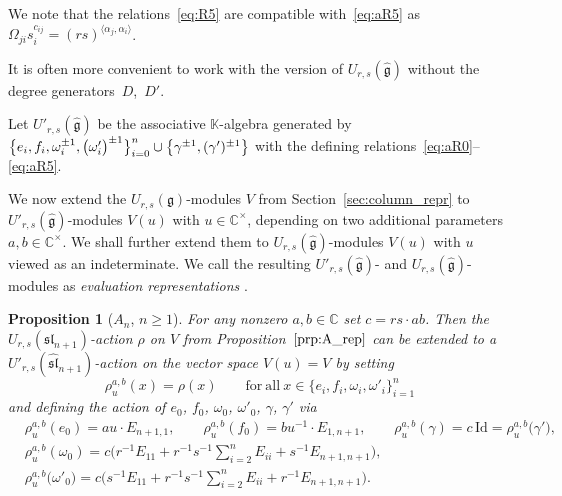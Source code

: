 \documentclass[pdftex]{sigma}
\numberwithin{equation}{section}
\newtheorem{Proposition}[Theorem]{Proposition}
 { \theoremstyle{definition}
\newtheorem{Definition}[Theorem]{Definition}
\newtheorem{Note}[Theorem]{Note}
\newtheorem{Example}[Theorem]{Example}
\newtheorem{Remark}[Theorem]{Remark} }
\newcommand{\fg}{\mathfrak{g}}
\newcommand{\BC}{\mathbb{C}}
\newcommand{\ssl}{\mathfrak{sl}}
\newcommand{\uu}{U_{r,s}(\fg)}
\newcommand{\UU}{U_{r,s}(\widehat{\fg})}
\newcommand{\Uu}{U'_{r,s}(\widehat{\fg})}
\newcommand{\Id}{\mathrm{Id}}
\begin{document}
 \begin{Remark}
We note that the relations~\eqref{eq:R5} are compatible with~\eqref{eq:aR5} as $\Omega_{ji}s_i^{c_{ij}}=(rs)^{\langle \alpha_j,\alpha_i\rangle}$.
\end{Remark}

It is often more convenient to work with the version of $\UU$ without the degree generators~$D$,~$D'$.

\begin{Definition}%
Let $\Uu$ be the associative $\mathbb{K}$-algebra generated by
$\smash{\bigl\{e_{i},f_{i},\omega_{i}^{\pm 1},\bigl(\omega_{i}'\bigr)^{\pm 1}\bigr\}_{i=0}^{n}}\cup \smash{\bigl\{\gamma^{\pm 1},(\gamma')^{\pm 1}\bigr\}}$
with the defining relations~\eqref{eq:aR0}--\eqref{eq:aR5}.
\end{Definition}

We now extend the $\uu$-modules $V$ from Section~\ref{sec:column_repr} to $\Uu$-modules $V(u)$ with $u\in\BC^\times$, depending on two additional parameters $a,b\in \BC^\times$. We shall further extend them to $\UU$-modules $V(u)$ with $u$ viewed as an indeterminate. We call the resulting $\Uu$- and $\UU$-modules as \emph{evaluation representations} .


\begin{Proposition}[$A_n$, $n\geq 1$]\label{prop:A_aff_rep}
For any nonzero $a,b\in \BC$ set $c=rs\cdot ab$. Then the $U_{r,s}(\ssl_{n+1})$-action $\rho$ on $V$ from Proposition~$\ref{prp:A_rep}$ can be extended to a $U'_{r,s}(\widehat{\ssl}_{n+1})$-action  on the vector space $V(u)=V$ by setting
\begin{displaymath}
 \rho^{a,b}_u(x)=\rho(x) \qquad \mathrm{for\ all} \ x\in \bigl\{e_i,f_i,\omega_i,\omega'_i\bigr\}_{i=1}^{n}
\end{displaymath}
and defining the action of $e_0$, $f_0$, $\omega_0$, $\omega'_0$, $\gamma$, $\gamma'$ via
\begin{displaymath}
\begin{split}
 & \rho^{a,b}_u(e_0)=au\cdot E_{n+1,1}, \qquad \rho^{a,b}_u(f_0)=bu^{-1}\cdot E_{1,n+1},
 \qquad \rho^{a,b}_u(\gamma)=c \, \Id=\rho^{a,b}_u\bigl(\gamma'\bigr), \\
 & \rho^{a,b}_u(\omega_0)=c\Biggl( r^{-1}E_{11}+r^{-1}s^{-1}\sum_{i=2}^{n}E_{ii}+s^{-1}E_{n+1,n+1} \Biggr), \\
 & \rho^{a,b}_u\bigl(\omega'_0\bigr)=c\Biggl( s^{-1}E_{11}+r^{-1}s^{-1}\sum_{i=2}^{n}E_{ii}+r^{-1}E_{n+1,n+1} \Biggr).
\end{split}
\end{displaymath}
\end{Proposition}
\end{document}
